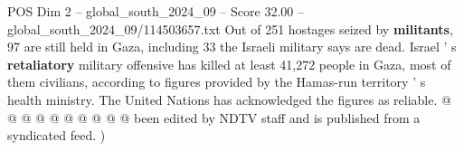 \begin{textsample}{POS Dim 2 – global\_south\_2024\_09 – Score 32.00 – global\_south\_2024\_09/114503657.txt}
Out of 251 hostages seized by \textbf{militants}, 97 are still held in Gaza, including 33 the Israeli military says are dead.
Israel ' s \textbf{retaliatory} military offensive has killed at least 41,272 people in Gaza, most of them civilians, according to figures provided by the Hamas-run territory ' s health ministry.
The United Nations has acknowledged the figures as reliable. @ @ @ @ @ @ @ @ @ @ been edited by NDTV staff and is published from a syndicated feed. )

\end{textsample}

